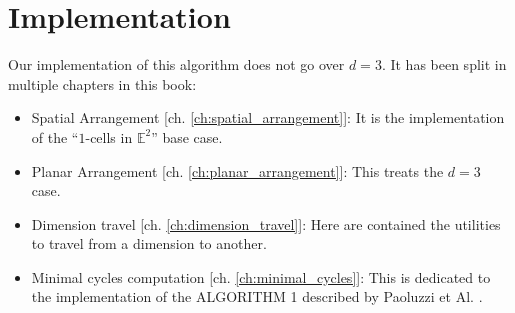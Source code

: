 \section{Implementation}

Our implementation of this algorithm does not go over
$d=3$. It has been split in
multiple chapters in this book:

\begin{itemize}[noitemsep]
    \item Spatial Arrangement [ch. \ref{ch:spatial_arrangement}]: 
        It is the implementation of the ``$1$-cells in $\mathbb{E}^2$'' base case.
    \item Planar Arrangement [ch. \ref{ch:planar_arrangement}]:
        This treats the $d=3$ case. 
    \item Dimension travel [ch. \ref{ch:dimension_travel}]:
        Here are contained the utilities to travel from a
        dimension to another.
    \item Minimal cycles computation [ch. \ref{ch:minimal_cycles}]:
        This is dedicated to the implementation of the ALGORITHM 1
        described by Paoluzzi et Al. \cite{Paoluzzi}.
\end{itemize}